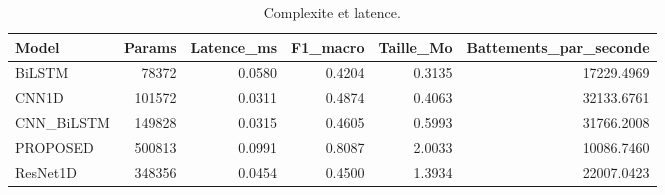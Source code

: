\begin{table}
\caption{Complexite et latence.}
\label{tab:complexity}
\begin{tabular}{lrrrrr}
\toprule
Model & Params & Latence_ms & F1_macro & Taille_Mo & Battements_par_seconde \\
\midrule
BiLSTM & 78372 & 0.0580 & 0.4204 & 0.3135 & 17229.4969 \\
CNN1D & 101572 & 0.0311 & 0.4874 & 0.4063 & 32133.6761 \\
CNN_BiLSTM & 149828 & 0.0315 & 0.4605 & 0.5993 & 31766.2008 \\
PROPOSED & 500813 & 0.0991 & 0.8087 & 2.0033 & 10086.7460 \\
ResNet1D & 348356 & 0.0454 & 0.4500 & 1.3934 & 22007.0423 \\
\bottomrule
\end{tabular}
\end{table}
